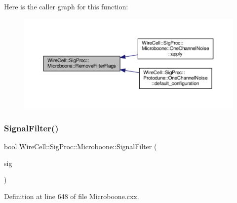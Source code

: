 Here is the caller graph for this function\+:
\nopagebreak
\begin{figure}[H]
\begin{center}
\leavevmode
\includegraphics[width=350pt]{namespace_wire_cell_1_1_sig_proc_1_1_microboone_a772813d4954fff2b2089d97db4bd5875_icgraph}
\end{center}
\end{figure}
\mbox{\label{namespace_wire_cell_1_1_sig_proc_1_1_microboone_a09348aad9dc69ef1d18d6145b03547ee}} 
\subsubsection{\texorpdfstring{Signal\+Filter()}{SignalFilter()}}
{\footnotesize\ttfamily bool Wire\+Cell\+::\+Sig\+Proc\+::\+Microboone\+::\+Signal\+Filter (\begin{DoxyParamCaption}\item[{\hyperlink{namespace_wire_cell_1_1_waveform_a479175e541c8545e87cd8063b74b6956}{Wire\+Cell\+::\+Waveform\+::realseq\+\_\+t} \&}]{sig }\end{DoxyParamCaption})}



Definition at line 648 of file Microboone.\+cxx.

